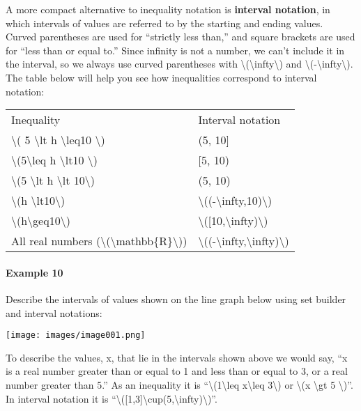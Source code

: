 A more compact alternative to inequality notation is \textbf{interval
notation}, in which intervals of values are referred to by the starting
and ending values. Curved parentheses are used for ``strictly less
than,'' and square brackets are used for ``less than or equal to.''
Since infinity is not a number, we can't include it in the interval, so
we always use curved parentheses with
\textbackslash{}(\textbackslash{}infty\textbackslash{}) and
\textbackslash{}(-\textbackslash{}infty\textbackslash{}). The table
below will help you see how inequalities correspond to interval
notation:

\begin{longtable}[]{@{}ll@{}}
\toprule
\endhead
Inequality & Interval notation\tabularnewline
\textbackslash{}( 5 \textbackslash{}lt h \textbackslash{}leq10
\textbackslash{}) & (5, 10{]}\tabularnewline
\textbackslash{}(5\textbackslash{}leq h \textbackslash{}lt10
\textbackslash{}) & {[}5, 10)\tabularnewline
\textbackslash{}(5 \textbackslash{}lt h \textbackslash{}lt
10\textbackslash{}) & (5, 10)\tabularnewline
\textbackslash{}(h \textbackslash{}lt10\textbackslash{}) &
\textbackslash{}((-\textbackslash{}infty,10)\textbackslash{})\tabularnewline
\textbackslash{}(h\textbackslash{}geq10\textbackslash{}) &
\textbackslash{}({[}10,\textbackslash{}infty)\textbackslash{})\tabularnewline
All real numbers
(\textbackslash{}(\textbackslash{}mathbb\{R\}\textbackslash{})) &
\textbackslash{}((-\textbackslash{}infty,\textbackslash{}infty)\textbackslash{})\tabularnewline
\bottomrule
\end{longtable}

\hypertarget{example-10}{%
\paragraph{Example 10}\label{example-10}}

Describe the intervals of values shown on the line graph below using set
builder and interval notations:

\texttt{[image: images/image001.png]}

To describe the values, x, that lie in the intervals shown above we
would say, ``x is a real number greater than or equal to 1 and less than
or equal to 3, or a real number greater than 5.'' As an inequality it is
``\textbackslash{}(1\textbackslash{}leq x\textbackslash{}leq
3\textbackslash{}) or \textbackslash{}(x \textbackslash{}gt 5
\textbackslash{})''. In interval notation it is
``\textbackslash{}({[}1,3{]}\textbackslash{}cup(5,\textbackslash{}infty)\textbackslash{})''.

